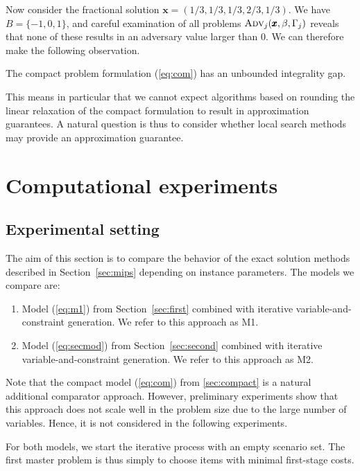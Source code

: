Now consider the fractional solution $\pmb{x}=(1/3,1/3,1/3,2/3,1/3)$. We have $B=\{-1,0,1\}$, and careful examination of all problems $\textsc{Adv}_j(\pmb{x},\beta,\Gamma_j)$ reveals that none of these results in an adversary value larger than 0. We can therefore make the following observation.

\begin{observation}
The compact problem formulation (\ref{eq:com}) has an unbounded integrality gap.
\end{observation}

This means in particular that we cannot expect algorithms based on rounding the linear relaxation of the compact formulation to result in approximation guarantees. A natural question is thus to consider whether local search methods may provide an approximation guarantee. 



\section{Computational experiments}
\label{sec:experiments}

\subsection{Experimental setting}

The aim of this section is to compare the behavior of the exact solution methods described in Section~\ref{sec:mips} depending on instance parameters. The models we compare are:
\begin{enumerate}
\item Model (\ref{eq:m1}) from Section~\ref{sec:first} combined with iterative variable-and-constraint generation. We refer to this approach as M1.
\item Model (\ref{eq:secmod}) from Section~\ref{sec:second} combined with iterative variable-and-constraint generation. We refer to this approach as M2.
\end{enumerate}
Note that the compact model (\ref{eq:com}) from \cref{sec:compact} is a natural additional comparator approach. However, preliminary experiments show that this approach does not scale well in the problem size due to the large number of variables. Hence, it is not considered in the following experiments.

For both models, we start the iterative process with an empty scenario set. The first master problem is thus simply to choose items with minimal first-stage costs.

